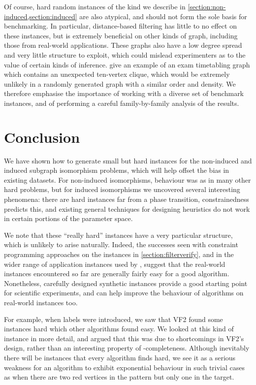 \documentclass[twoside,11pt]{article}
\begin{document}
Of course, hard random instances of the kind we describe in
\cref{section:non-induced,section:induced} are also atypical, and should not form the sole basis for
benchmarking. In particular, distance-based filtering
\cite{DBLP:conf/cp/AudemardLMGP14,DBLP:conf/cp/McCreeshP15,DBLP:conf/lion/KotthoffMS16} has little
to no effect on these instances, but is extremely beneficial on other kinds of graph, including
those from real-world applications.  These graphs also have a low degree spread and very little
structure to exploit, which could mislead experimenters as to the value of certain kinds of
inference.  give an example of an exam timetabling graph which contains an
unexpected ten-vertex clique, which would be extremely unlikely in a randomly generated graph with a
similar order and density. We therefore emphasise the importance of working with a diverse set of
benchmark instances, and of performing a careful family-by-family analysis of the results.

\section{Conclusion}

We have shown how to generate small but hard instances for the non-induced and induced subgraph
isomorphism problems, which will help offset the bias in existing datasets. For non-induced
isomorphisms, behaviour was as in many other hard problems, but for induced isomorphisms we
uncovered several interesting phenomena: there are hard instances far from a phase transition,
constrainedness predicts this, and existing general techniques for designing heuristics do not work
in certain portions of the parameter space.

We note that these ``really hard'' instances have a very particular structure, which is unlikely to
arise naturally. Indeed, the successes seen with constraint programming approaches on the instances
in \cref{section:filterverify}, and in the wider range of application instances used by
, suggest that the real-world instances encountered so far are
generally fairly easy for a good algorithm. Nonetheless, carefully designed synthetic instances
provide a good starting point for scientific experiments, and can help improve the behaviour of
algorithms on real-world instances too.

For example, when labels were introduced, we saw that VF2 found some instances hard which other
algorithms found easy. We looked at this kind of instance in more detail, and argued that this was
due to shortcomings in VF2's design, rather than an interesting property of \NP-completeness.
Although inevitably there will be instances that every algorithm finds hard, we see it as a serious
weakness for an algorithm to exhibit exponential behaviour in such trivial cases as when there are
two red vertices in the pattern but only one in the target.
\end{document}
